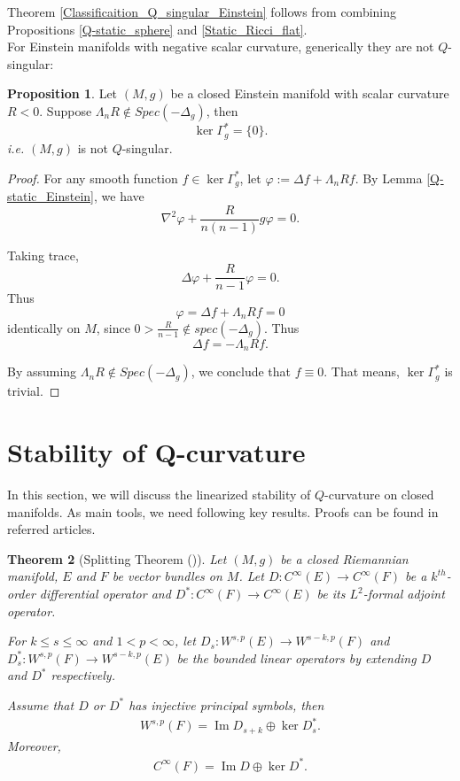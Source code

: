 \documentclass[12pt]{amsart}
\newtheorem{theorem}{Theorem}[section]
\theoremstyle{definition}
\newtheorem{proposition}[theorem]{Proposition}
\theoremstyle{remark}
\numberwithin{equation}{section}
\begin{document}
Theorem \ref{Classificaition_Q_singular_Einstein} follows from combining Propositions \ref{Q-static_sphere} and \ref{Static_Ricci_flat}.\\

For Einstein manifolds with negative scalar curvature, generically they are not $Q$-singular:
\begin{proposition}\label{Q-hyperbolic}
Let $(M, g)$ be a closed Einstein manifold with scalar curvature $R < 0$. Suppose $\Lambda_n R \not\in Spec(-\Delta_g)$, then $$\ker \Gamma_g^* = \{0\}.$$ \emph{i.e.} $(M, g)$ is not $Q$-singular.
\end{proposition}

\begin{proof}
For any smooth function $f\in  \ker \Gamma_g^*$, let $\varphi := \Delta f + \Lambda_n R f$. By Lemma \ref{Q-static_Einstein}, we have $$\nabla^2 \varphi + \frac{R}{n(n-1)}g\varphi = 0.$$

Taking trace,
$$\Delta \varphi + \frac{R}{n-1}\varphi = 0.$$
Thus $$\varphi = \Delta f + \Lambda_n R f = 0$$ identically on $M$, since $0 > \frac{R}{n-1} \not\in spec(-\Delta_g)$. Thus $$\Delta f = - \Lambda_n R f .$$ 

By assuming $\Lambda_n R \not\in Spec(-\Delta_g)$, we conclude that $f \equiv 0$. That means, $\ker \Gamma_g^*$ is trivial.

\end{proof}

\section{Stability of Q-curvature}

In this section, we will discuss the linearized stability of $Q$-curvature on closed manifolds.
As main tools, we need following key results. Proofs can be found in referred articles.

\begin{theorem}[Splitting Theorem (\cite{B-E, F-M})]\label{Splitting_Theorem}
Let $(M,g)$ be a closed Riemannian manifold, $E$ and $F$ be vector bundles on $M$. Let $D : C^\infty (E) \rightarrow C^\infty(F)$ be a $k^{th}$-order differential operator and $D^* : C^\infty(F) \rightarrow C^\infty(E)$ be its $L^2$-formal adjoint operator.

For $k \leq s\leq \infty$ and $1< p < \infty$, let $D_s : W^{s,p}(E) \rightarrow W^{s-k,p}(F)$ and $D_s^* : W^{s,p}(F) \rightarrow W^{s-k,p}(E)$ be the bounded linear operators by extending $D$ and $D^*$ respectively.

Assume that $D$ or $D^*$ has injective principal symbols, then
\begin{align}
W^{s,p}(F) =  \operatorname{Im} D_{s+k} \oplus \ker D_s^*.
\end{align}
Moreover,
\begin{align}
C^\infty(F) = \operatorname{Im} D \oplus \ker D^*.
\end{align}
\end{theorem}
\end{document}
